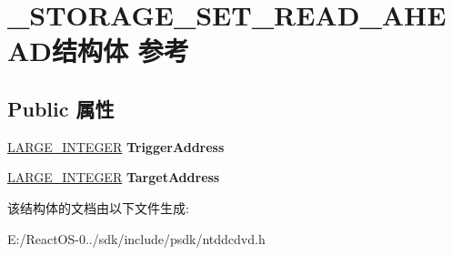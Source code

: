 \hypertarget{struct___s_t_o_r_a_g_e___s_e_t___r_e_a_d___a_h_e_a_d}{}\section{\+\_\+\+S\+T\+O\+R\+A\+G\+E\+\_\+\+S\+E\+T\+\_\+\+R\+E\+A\+D\+\_\+\+A\+H\+E\+A\+D结构体 参考}
\label{struct___s_t_o_r_a_g_e___s_e_t___r_e_a_d___a_h_e_a_d}
\subsection*{Public 属性}
\begin{DoxyCompactItemize}
\item 
\mbox{\label{struct___s_t_o_r_a_g_e___s_e_t___r_e_a_d___a_h_e_a_d_a262919eca197665d7e2810be30724e26}} 
\hyperlink{union___l_a_r_g_e___i_n_t_e_g_e_r}{L\+A\+R\+G\+E\+\_\+\+I\+N\+T\+E\+G\+ER} {\bfseries Trigger\+Address}
\item 
\mbox{\label{struct___s_t_o_r_a_g_e___s_e_t___r_e_a_d___a_h_e_a_d_a480034f5c87a3b3f34c3767d0f70596b}} 
\hyperlink{union___l_a_r_g_e___i_n_t_e_g_e_r}{L\+A\+R\+G\+E\+\_\+\+I\+N\+T\+E\+G\+ER} {\bfseries Target\+Address}
\end{DoxyCompactItemize}


该结构体的文档由以下文件生成\+:\begin{DoxyCompactItemize}
\item 
E\+:/\+React\+O\+S-\/0../sdk/include/psdk/ntddcdvd.\+h\end{DoxyCompactItemize}
